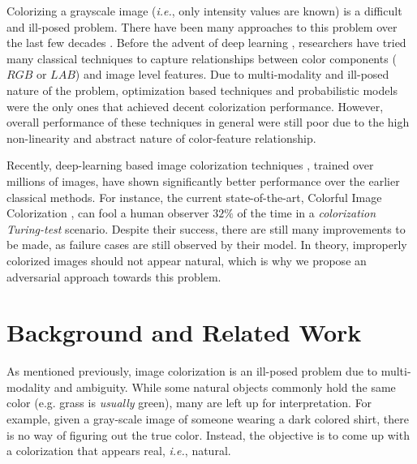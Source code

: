 \documentclass[10pt]{article}
\begin{document}
Colorizing a grayscale image (\textit{i.e.}, only intensity values are known) is a difficult and ill-posed problem. There have been many approaches to this problem over the last few decades
\cite{zhang2016colorful, cheng2015deep, bugeau2014variational, charpiat2008automatic, luan2007natural, konushin2006interactive}. Before the advent of deep learning \cite{lecun2015deep},
researchers have tried many classical techniques \cite{charpiat2008automatic, luan2007natural, konushin2006interactive, levin2004colorization, lagodzinski2008digital} to capture relationships
between color components ($RGB$ or $LAB$) and image level features. Due to multi-modality and ill-posed nature of the problem, optimization based techniques \cite{levin2004colorization, charpiat2008automatic}
and probabilistic models \cite{lagodzinski2008digital} were the only ones that achieved decent colorization performance. However, overall performance of these techniques in general
were still poor due to the high non-linearity and abstract nature of color-feature relationship.  

Recently, deep-learning based image colorization techniques \cite{zhang2016colorful, cheng2015deep, varga2016fully, li2017watergan}, trained over millions of images, have shown significantly
better performance over the earlier classical methods. For instance, the current state-of-the-art, Colorful Image Colorization \cite{zhang2016colorful}, can fool a human observer $32\%$ of the
time in a \textit{colorization Turing-test} scenario. Despite their success, there are still many improvements to be made, as failure cases are still observed by their model. In theory, improperly
colorized images should not appear natural, which is why we propose an adversarial approach towards this problem.

\section{Background and Related Work}\label{sec:back}
As mentioned previously, image colorization is an ill-posed problem due to multi-modality and ambiguity. 
While some natural objects commonly hold the same color (e.g. grass is \textit{usually} green), many are left up for interpretation. 
For example, given a gray-scale image of someone wearing a dark colored shirt, there is no way of figuring out the true color. 
Instead, the objective is to come up with a colorization that appears real, \textit{i.e.}, natural. 
\end{document}
